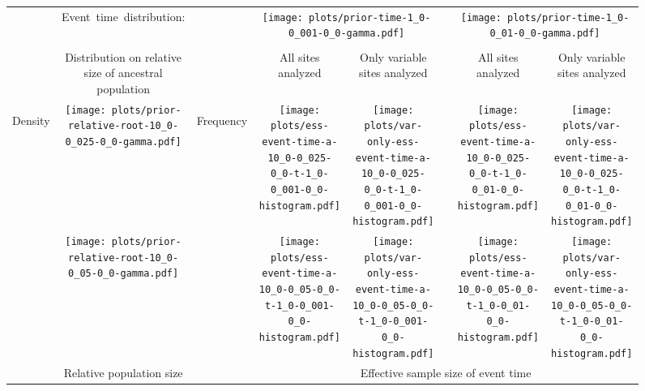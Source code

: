 \documentclass[border=10pt,varwidth=30cm]{standalone}
\begin{document}
\begin{figure}
    \centering
    \begin{tabular}{@{}cccccccc@{}}
        & \multirow{1}{0.15\textwidth}[8em]{\centering\Large Event~time~distribution:}
        &
        & \multicolumn{2}{c}{\texttt{[image: plots/prior-time-1\_0-0\_001-0\_0-gamma.pdf]}}
        &
        & \multicolumn{2}{c}{\texttt{[image: plots/prior-time-1\_0-0\_01-0\_0-gamma.pdf]}} \\
        \cline{1-2}\cline{4-5}\cline{7-8}
        & & & & & & & \\
        & \multirow{1}{0.15\textwidth}{\centering\Large Distribution on relative size of ancestral population}
        &
        & \multirow{1}{0.15\textwidth}{\centering\Large All sites analyzed}
        & \multirow{1}{0.15\textwidth}{\centering\Large Only variable sites analyzed}
        &
        & \multirow{1}{0.15\textwidth}{\centering\Large All sites analyzed}
        & \multirow{1}{0.15\textwidth}{\centering\Large Only variable sites analyzed} \\[9ex]
        \multirow{2}{*}[1em]{\begin{sideways}\large Density\end{sideways}}
        & \texttt{[image: plots/prior-relative-root-10\_0-0\_025-0\_0-gamma.pdf]}
        & \multirow{2}{*}[2em]{\begin{sideways}\large Frequency\end{sideways}}
        & \texttt{[image: plots/ess-event-time-a-10\_0-0\_025-0\_0-t-1\_0-0\_001-0\_0-histogram.pdf]}
        & \texttt{[image: plots/var-only-ess-event-time-a-10\_0-0\_025-0\_0-t-1\_0-0\_001-0\_0-histogram.pdf]}
        &
        & \texttt{[image: plots/ess-event-time-a-10\_0-0\_025-0\_0-t-1\_0-0\_01-0\_0-histogram.pdf]}
        & \texttt{[image: plots/var-only-ess-event-time-a-10\_0-0\_025-0\_0-t-1\_0-0\_01-0\_0-histogram.pdf]} \\
        & \texttt{[image: plots/prior-relative-root-10\_0-0\_05-0\_0-gamma.pdf]}
        &
        & \texttt{[image: plots/ess-event-time-a-10\_0-0\_05-0\_0-t-1\_0-0\_001-0\_0-histogram.pdf]}
        & \texttt{[image: plots/var-only-ess-event-time-a-10\_0-0\_05-0\_0-t-1\_0-0\_001-0\_0-histogram.pdf]}
        &
        & \texttt{[image: plots/ess-event-time-a-10\_0-0\_05-0\_0-t-1\_0-0\_01-0\_0-histogram.pdf]}
        & \texttt{[image: plots/var-only-ess-event-time-a-10\_0-0\_05-0\_0-t-1\_0-0\_01-0\_0-histogram.pdf]} \\
        & \multirow{1}{0.15\textwidth}{\centering\large Relative population size}
        &
        & \multicolumn{5}{c}{\large Effective sample size of event time} \\
    \end{tabular}
\end{figure}
\end{document}
